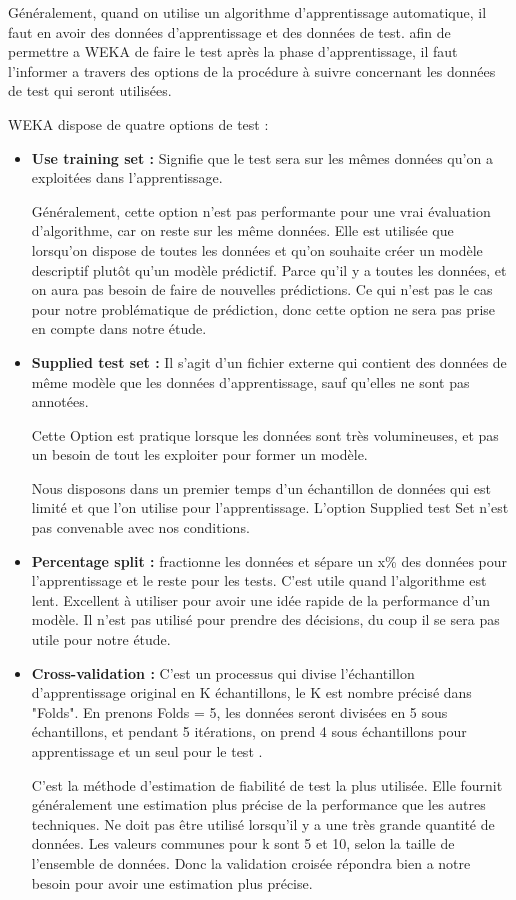 Généralement, quand on utilise un algorithme d'apprentissage automatique, il faut en avoir des données d'apprentissage et des données de test. afin de permettre a WEKA de faire le test après la phase d'apprentissage, il faut l'informer a travers des options de la procédure à suivre concernant les données de test qui seront utilisées.

WEKA dispose de quatre options de test : 

\begin{itemize}

\item \textbf{Use training set : }  Signifie que le test sera sur les mêmes données qu'on a exploitées dans l'apprentissage. 

Généralement, cette option n'est pas performante pour une vrai évaluation d'algorithme, car on reste sur les même données.
Elle est utilisée que lorsqu'on dispose de toutes les données et qu'on souhaite créer un modèle descriptif plutôt qu'un modèle prédictif. Parce qu'il y a toutes les données, et on aura pas besoin de faire de nouvelles prédictions. Ce qui n'est pas le cas pour notre problématique de prédiction, donc cette option ne sera pas prise en compte dans notre étude.


\item \textbf{Supplied test set : }   Il s'agit d'un fichier externe qui contient des données de même modèle que les données d'apprentissage, sauf qu'elles ne sont pas annotées.

Cette Option est pratique lorsque les données sont très volumineuses, et pas un besoin de tout les exploiter pour former un modèle.

Nous disposons dans un premier temps d'un échantillon de données qui est limité et que l'on utilise pour l'apprentissage. L'option Supplied test Set n'est pas convenable avec nos conditions.


\item \textbf{Percentage split : } fractionne les données et sépare un x\% des données pour l'apprentissage et le reste pour les tests. C'est utile quand l'algorithme est lent.
Excellent à utiliser pour avoir une idée rapide de la performance d'un modèle. Il n'est pas utilisé pour prendre des décisions, du coup il se sera pas utile pour notre étude.

\item \textbf{Cross-validation : }C'est un processus qui divise l'échantillon d'apprentissage original en K échantillons, le K est nombre précisé dans "Folds".  
En prenons Folds = 5, les données seront divisées en 5 sous échantillons, et pendant 5 itérations, on prend 4 sous échantillons pour apprentissage et un seul pour le test \cite{7}.

C'est la méthode d’estimation de fiabilité de test la plus utilisée. Elle fournit généralement une estimation plus précise de la performance que les autres techniques. Ne doit pas être utilisé lorsqu'il y a une très grande quantité de données. Les valeurs communes pour k sont 5 et 10, selon la taille de l'ensemble de données. Donc la validation croisée répondra bien a notre besoin pour avoir une estimation plus précise. 

\end{itemize}

